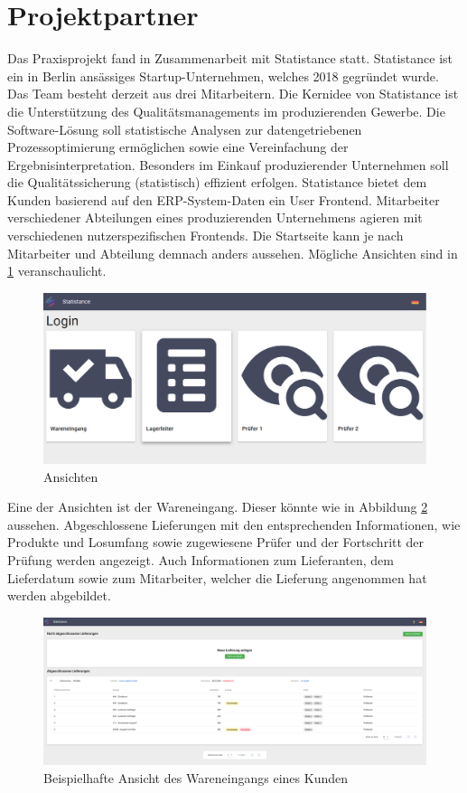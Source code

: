 \section{Projektpartner}
Das Praxisprojekt fand in Zusammenarbeit mit Statistance statt. Statistance ist ein in Berlin ansässiges Startup-Unternehmen, welches 2018 gegründet wurde. Das Team besteht derzeit aus drei Mitarbeitern. Die Kernidee von Statistance ist die Unterstützung des Qualitätsmanagements im produzierenden Gewerbe. Die Software-Lösung soll statistische Analysen zur datengetriebenen Prozessoptimierung ermöglichen sowie eine Vereinfachung der Ergebnisinterpretation. Besonders im Einkauf produzierender Unternehmen soll die Qualitätssicherung (statistisch) effizient erfolgen. Statistance bietet dem Kunden basierend auf den ERP-System-Daten ein User Frontend. Mitarbeiter verschiedener Abteilungen eines produzierenden Unternehmens agieren mit verschiedenen nutzerspezifischen Frontends. 
Die Startseite kann je nach Mitarbeiter und Abteilung demnach anders aussehen. Mögliche Ansichten sind in \ref{fig:Startpage} veranschaulicht. \cite{statistanceStartseite}

\begin{figure}[!h]
\centering
\includegraphics[width=15cm]{images/01_introduction/Statistance_StartPage.PNG}
\caption{Ansichten}
\label{fig:Startpage}
\end{figure}
Eine der Ansichten ist der Wareneingang. Dieser könnte wie in Abbildung \ref{fig:Wareneingang} aussehen. \cite{statistanceWareneingang} Abgeschlossene Lieferungen mit den entsprechenden Informationen, wie Produkte und Losumfang sowie zugewiesene Prüfer und der Fortschritt der Prüfung werden angezeigt. Auch Informationen zum Lieferanten, dem Lieferdatum sowie zum Mitarbeiter, welcher die Lieferung angenommen hat werden abgebildet.
\begin{figure}[!h]
\centering
\includegraphics[width=15cm]{images/01_introduction/Statistance_Wareneingang.PNG}
\caption{Beispielhafte Ansicht des Wareneingangs eines Kunden}
\label{fig:Wareneingang}
\end{figure}


